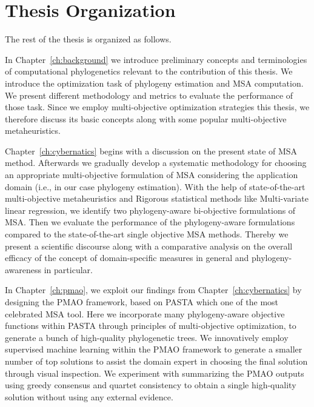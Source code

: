 \section{Thesis Organization}

The rest of the thesis is organized as follows.

In Chapter~\ref{ch:background} we introduce preliminary concepts and terminologies of computational phylogenetics
relevant to the contribution of this thesis. We introduce the optimization task of phylogeny estimation and MSA computation. We present different methodology and metrics to evaluate the performance of those task. Since we employ multi-objective optimization strategies this thesis, we therefore discuss its basic concepts along with some popular multi-objective metaheuristics.

Chapter~\ref{ch:cybernatics} begins with a discussion on the present state of MSA method. Afterwards we gradually develop a systematic methodology for choosing an appropriate multi-objective formulation of MSA considering the application domain (i.e., in our case phylogeny estimation). With the help of state-of-the-art multi-objective metaheuristics and Rigorous statistical methods like Multi-variate linear regression, we identify two phylogeny-aware bi-objective formulations of MSA. Then we evaluate the performance of the phylogeny-aware formulations compared to the state-of-the-art single objective MSA methods. Thereby we present a scientific discourse along with a comparative analysis on the overall efficacy of the concept of domain-specific measures in general and phylogeny-awareness in particular. 

In Chapter~\ref{ch:pmao}, we exploit our findings from Chapter~\ref{ch:cybernatics} by designing the PMAO framework, based on PASTA which one of the most celebrated MSA tool. Here we incorporate many phylogeny-aware objective functions within PASTA through principles of multi-objective optimization, to generate a bunch of high-quality phylogenetic trees. We innovatively employ supervised machine learning within the PMAO framework to generate a smaller number of top solutions to assist the domain expert in choosing the final solution through visual inspection. We experiment with summarizing the PMAO outputs using greedy consensus and quartet consistency to obtain a single high-quality solution without using any external evidence.


